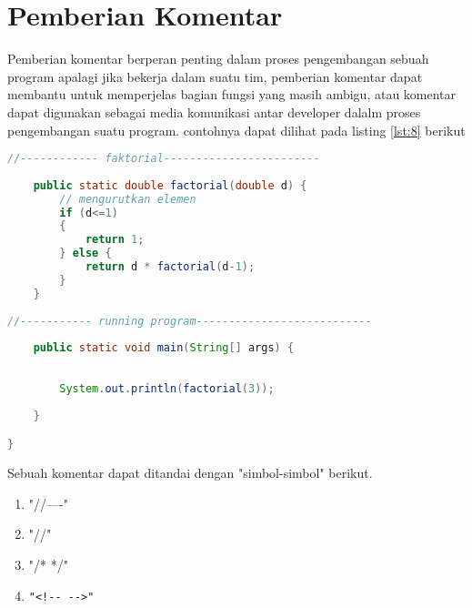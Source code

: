 \section{Pemberian Komentar}
\par 
Pemberian komentar berperan penting dalam proses pengembangan sebuah program apalagi jika bekerja dalam suatu tim, pemberian komentar dapat membantu untuk memperjelas bagian fungsi yang masih ambigu, atau komentar dapat digunakan sebagai media komunikasi antar developer dalalm proses pengembangan suatu program. contohnya dapat dilihat pada listing \ref{lst:8} berikut

\begin{lstlisting}[language=Java, caption=Contoh pemberian komentar,label={lst:8}]
//------------ faktorial------------------------
	
	public static double factorial(double d) {
		// mengurutkan elemen
		if (d<=1)
		{
			return 1;
		} else {
			return d * factorial(d-1);
		}
	}
	
//----------- running program---------------------------
	
	public static void main(String[] args) {
	
		
		System.out.println(factorial(3));
		
	}

}
\end{lstlisting}
\par 
Sebuah komentar dapat ditandai dengan "simbol-simbol" berikut.
\begin{enumerate}
\item "//----"
\item "//"
\item "/* */"
\item 
\begin{verbatim}
"<!-- -->"
\end{verbatim}

\end{enumerate}
